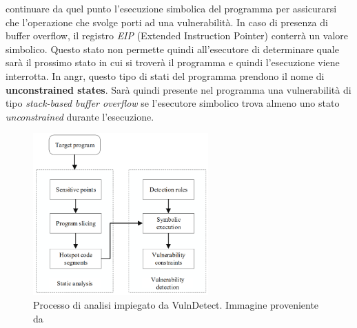 \documentclass[../main.tex]{subfiles}
\begin{document}
\begin{enumerate}
    continuare da quel punto l'esecuzione simbolica del programma per assicurarsi che l'operazione che svolge porti ad una vulnerabilità. In caso di presenza di buffer overflow, il registro \textit{EIP} (Extended Instruction Pointer) conterrà un valore simbolico. Questo stato non permette quindi all'esecutore di determinare quale sarà il prossimo
    stato in cui si troverà il programma e quindi l'esecuzione viene interrotta. In angr, questo tipo di stati del programma prendono il nome di \textbf{unconstrained states}. 
    Sarà quindi presente nel programma una vulnerabilità di tipo \textit{stack-based buffer overflow} se l'esecutore simbolico trova almeno uno stato \textit{unconstrained} durante l'esecuzione.
\end{enumerate}
\begin{figure}[H]
    \centering
    \includegraphics[width = 0.60\textwidth]{../images/VulnDetect.png}
    \caption{Processo di analisi impiegato da VulnDetect. Immagine proveniente da \cite{VulnDetect}}
\end{figure}
\end{document}
